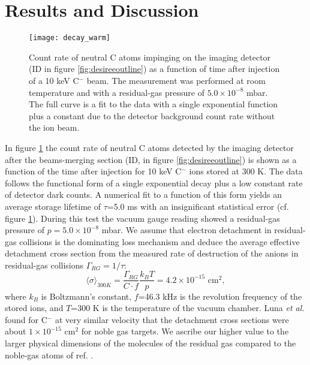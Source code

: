 \documentclass[aps,pra,preprint,superscriptaddress]{revtex4}
\begin{document}
\section{Results and Discussion}
\begin{figure}
	\centering
		\texttt{[image: decay\_warm]}
	\caption{Count rate of neutral C atoms impinging on the imaging detector (ID in figure \ref{fig:desireeoutline}) as a function of time after injection of a 10 keV C$^-$ beam. The measurement was performed at room temperature and with a residual-gas pressure of $5.0 \times 10^{-8}$ mbar. The full curve is a fit to the data with a single exponential function plus a constant due to the detector background count rate without the ion beam.}
	\label{fig:decay_warm}
\end{figure}
In figure \ref{fig:decay_warm} the count rate of neutral C atoms detected by the imaging detector after the beams-merging section (ID, in figure \ref{fig:desireeoutline}) is shown as a function of the time after injection for 10 keV C$^-$ ions stored at 300 K. The data follows the functional form of a single exponential decay plus a low constant rate of detector dark counts. A numerical fit to a function of this form yields an average storage lifetime of $\tau$=5.0 ms with an insignificant statistical error (cf. figure \ref{fig:decay_warm}). During this test the vacuum gauge reading showed a residual-gas pressure of $p=5.0 \times 10^{-8}$ mbar.
We assume that electron detachment in residual-gas collisions is the dominating loss mechanism and deduce the average effective detachment cross section from the measured rate of destruction of the anions in residual-gas collisions $\Gamma_{RG}=1/\tau$:
\begin{equation}
\langle \sigma \rangle_{300K} = \frac{\Gamma_{RG}}{C \cdot f} \frac{k_B T}{p} = 4.2 \times 10^{-15} \text{ cm}^2,
\label{eqn:sigma}
\end{equation}
where $k_B$ is Boltzmann's constant, $f$=46.3 kHz is the revolution frequency of the stored ions, and $T$=300 K is the temperature of the vacuum chamber.
Luna {\it et al.} \cite{Lun01} found for C$^-$ at very similar velocity that the detachment cross sections were about $1 \times 10^{-15}$ cm$^2$ for noble gas targets. We ascribe our higher value to the larger physical dimensions of the molecules of the residual gas compared to the noble-gas atoms of ref. \cite{Lun01}.
\end{document}
